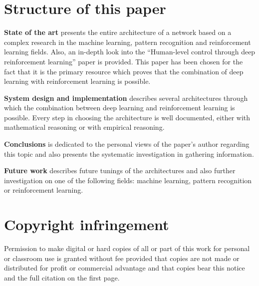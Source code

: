 \section{Structure of this paper}
\label{sec:paper_structure}

 \textbf{State of the art} presents the entire architecture of a network based on a complex research in the machine learning, pattern recognition and reinforcement learning fields. Also, an in-depth look into the ``Human-level control through deep reinforcement learning'' paper is provided. This paper has been chosen for the fact that it is the primary resource which proves that the combination of deep learning with reinforcement learning is possible. 

 \textbf{System design and implementation} describes several architectures through which the combination between deep learning and reinforcement learning is possible. Every step in choosing the architecture is well documented, either with mathematical reasoning or with empirical reasoning.

 \textbf{Conclusions} is dedicated to the personal views of the paper's author regarding this topic and also presents the systematic investigation in gathering information.

 \textbf{Future work} describes future tunings of the architectures and also further investigation on one of the following fields: machine learning, pattern recognition or reinforcement learning.

\section{Copyright infringement}
\label{sec:copyright}
Permission to make digital or hard copies of all or part of this work for personal or classroom use is granted without fee provided that copies are not made or distributed for profit or commercial advantage and that copies bear this notice and the full citation on the first page. 







